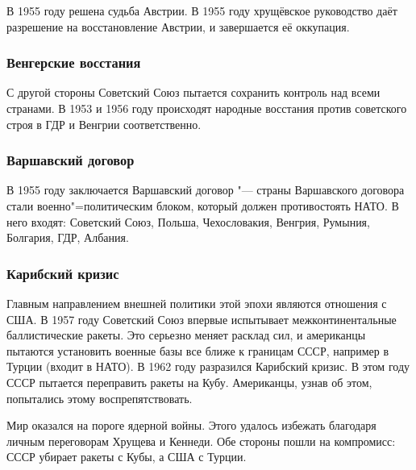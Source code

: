 В 1955 году решена судьба Австрии. В 1955 году хрущёвское руководство даёт разрешение на восстановление Австрии, и завершается её оккупация.

\subsubsection{\textbf{Венгерские восстания}}

С другой стороны Советский Союз пытается сохранить контроль над всеми странами. В 1953 и 1956 году происходят народные восстания против советского строя в ГДР и Венгрии соответственно. 

\subsubsection{\textbf{Варшавский договор}}

В 1955 году заключается Варшавский договор "--- страны Варшавского договора стали военно"=политическим блоком, который должен противостоять НАТО. В него входят: Советский Союз, Польша, Чехословакия, Венгрия, Румыния, Болгария, ГДР, Албания.

\subsubsection{\textbf{Карибский кризис}}

Главным направлением внешней политики этой эпохи являются отношения с США. В 1957 году Советский Союз впервые испытывает межконтинентальные баллистические ракеты. Это серьезно меняет расклад сил, и американцы пытаются установить военные базы все ближе к границам СССР, например в Турции (входит в НАТО). В 1962 году разразился Карибский кризис. В этом году СССР пытается переправить ракеты на Кубу. Американцы, узнав об этом, попытались этому воспрепятствовать. 

Мир оказался на пороге ядерной войны. Этого удалось избежать благодаря личным переговорам Хрущева и Кеннеди. Обе стороны пошли на компромисс: СССР убирает ракеты с Кубы, а США с Турции. 
